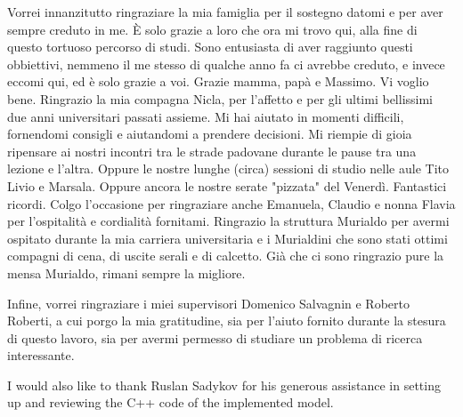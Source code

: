 \vspace{1.0cm}
{
	\setlength\parindent{0pt}

	Vorrei innanzitutto ringraziare la mia famiglia per il sostegno datomi e per aver sempre creduto in me.
	È solo grazie a loro che ora mi trovo qui, alla fine di questo tortuoso percorso di studi.
	Sono entusiasta di aver raggiunto questi obbiettivi, nemmeno il me stesso di qualche anno fa ci avrebbe creduto,
	e invece eccomi qui, ed è solo grazie a voi.
	Grazie mamma, papà e Massimo.
	Vi voglio bene.
	Ringrazio la mia compagna Nicla, per l'affetto e per gli ultimi bellissimi due anni universitari passati assieme.
	Mi hai aiutato in momenti difficili, fornendomi consigli e aiutandomi a prendere decisioni.
	Mi riempie di gioia ripensare ai nostri incontri tra le strade padovane durante le pause tra una lezione e l'altra.
	Oppure le nostre lunghe (circa) sessioni di studio nelle aule Tito Livio e Marsala.
	Oppure ancora le nostre serate "pizzata" del Venerdì.
	Fantastici ricordi.
	Colgo l'occasione per ringraziare anche Emanuela, Claudio e nonna Flavia per l'ospitalità
	e cordialità fornitami.
	Ringrazio la struttura Murialdo per avermi ospitato durante la mia carriera universitaria e
	i Murialdini che sono stati ottimi compagni di cena, di uscite serali e di calcetto.
	Già che ci sono ringrazio pure la mensa Murialdo, rimani sempre la migliore.

	\medskip

	Infine, vorrei ringraziare i miei supervisori Domenico Salvagnin e Roberto Roberti,
	a cui porgo la mia gratitudine, sia per l'aiuto fornito durante la stesura di questo lavoro,
	sia per avermi permesso di studiare un problema di ricerca interessante.

	I would also like to thank Ruslan Sadykov for his generous assistance in setting up \bapcod{} and reviewing the C++ code of the implemented model.

}


\vspace{1cm}

{
	\setlength\parindent{0pt}

	\textit{\UnivPlace}\\
	\textit{\GraduationDate}    \hfill    \AuthorName{} \AuthorSurname{}
}
